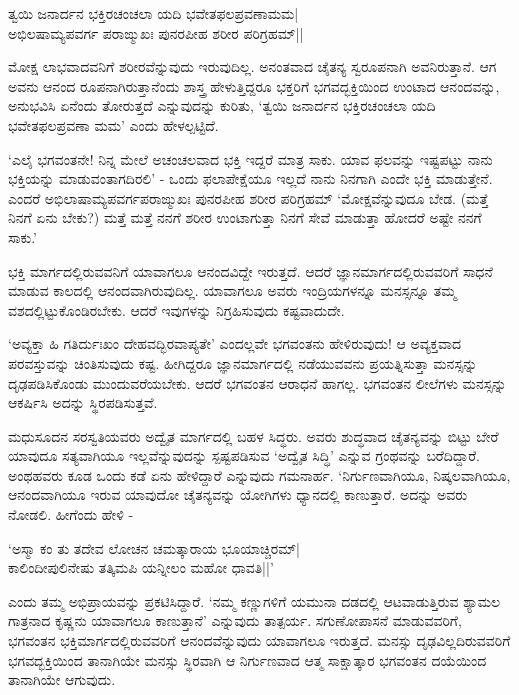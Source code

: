 \begin{shloka}
ತ್ವಯಿ ಜನಾರ್ದನ ಭಕ್ತಿರಚಂಚಲಾ ಯದಿ ಭವೇತಫಲಪ್ರವಣಾಮಮ|\\
ಅಭಿಲಷಾಮ್ಯಪವರ್ಗ ಪರಾಙ್ಮುಖಃ ಪುನರಪೀಹ ಶರೀರ ಪರಿಗ್ರಹಮ್||
\end{shloka}

ಮೋಕ್ಷ ಲಾಭವಾದವನಿಗೆ 
ಶರೀರವೆನ್ನುವುದು 
ಇರುವುದಿಲ್ಲ. ಅನಂತವಾದ 
ಚೈತನ್ಯ ಸ್ವರೂಪನಾಗಿ 
ಅವನಿರುತ್ತಾನೆ. ಆಗ ಅವನು ಆನಂದ 
ರೂಪನಾಗಿರುತ್ತಾನೆಂದು 
ಶಾಸ್ತ್ರ ಹೇಳುತ್ತಿದ್ದರೂ 
ಭಕ್ತರಿಗೆ ಭಗವದ್ಭಕ್ತಿಯಿಂದ 
ಉಂಟಾದ ಆನಂದವನ್ನು, ಅನುಭವಿಸಿ 
ಏನೆಂದು ತೋರುತ್ತದೆ 
ಎನ್ನುವುದನ್ನು ಕುರಿತು, 
`ತ್ವಯಿ ಜನಾರ್ದನ ಭಕ್ತಿರಚಂಚಲಾ ಯದಿ ಭವೇತಫಲಪ್ರವಣಾ ಮಮ' ಎಂದು ಹೇಳಲ್ಪಟ್ಟಿದೆ.

`ಎಲೈ ಭಗವಂತನೇ! ನಿನ್ನ ಮೇಲೆ 
ಅಚಂಚಲವಾದ ಭಕ್ತಿ ಇದ್ದರೆ 
ಮಾತ್ರ ಸಾಕು. ಯಾವ ಫಲವನ್ನು 
ಇಷ್ಟಪಟ್ಟು ನಾನು ಭಕ್ತಿಯನ್ನು 
ಮಾಡುವಂತಾಗದಿರಲಿ' - ಒಂದು 
ಫಲಾಪೇಕ್ಷೆಯೂ ಇಲ್ಲದೆ ನಾನು 
ನಿನಗಾಗಿ ಎಂದೇ ಭಕ್ತಿ 
ಮಾಡುತ್ತೇನೆ. ಎಂದರೆ 
ಅಭಿಲಾಷಾಮ್ಯಪವರ್ಗಪರಾಙ್ಮುಖಃ ಪುನರಪೀಹ ಶರೀರ ಪರಿಗ್ರಹಮ್ `ಮೋಕ್ಷವೆನ್ನುವುದೂ ಬೇಡ. (ಮತ್ತೆ ನಿನಗೆ ಏನು ಬೇಕು?) ಮತ್ತೆ ಮತ್ತೆ ನನಗೆ ಶರೀರ ಉಂಟಾಗುತ್ತಾ ನಿನಗೆ ಸೇವೆ ಮಾಡುತ್ತಾ ಹೋದರೆ ಅಷ್ಟೇ ನನಗೆ ಸಾಕು.'

ಭಕ್ತಿ ಮಾರ್ಗದಲ್ಲಿರುವವನಿಗೆ 
ಯಾವಾಗಲೂ ಆನಂದವಿದ್ದೇ 
ಇರುತ್ತದೆ. ಆದರೆ 
ಜ್ಞಾನಮಾರ್ಗದಲ್ಲಿರುವವರಿಗೆ 
ಸಾಧನೆ ಮಾಡುವ ಕಾಲದಲ್ಲಿ 
ಆನಂದವಾಗಿರುವುದಿಲ್ಲ. 
ಯಾವಾಗಲೂ ಅವರು 
ಇಂದ್ರಿಯಗಳನ್ನೂ ಮನಸ್ಸನ್ನೂ 
ತಮ್ಮ ವಶದಲ್ಲಿಟ್ಟುಕೊಂಡಿರಬೇಕು. ಆದರೆ ಇವುಗಳನ್ನು ನಿಗ್ರಹಿಸುವುದು ಕಷ್ಟವಾದುದೇ.

`ಅವ್ಯಕ್ತಾ ಹಿ ಗತಿರ್ದುಃಖಂ 
ದೇಹವದ್ಭಿರವಾಪ್ಯತೇ' 
ಎಂದಲ್ಲವೇ ಭಗವಂತನು 
ಹೇಳಿರುವುದು! ಆ ಅವ್ಯಕ್ತವಾದ 
ಪರವಸ್ತುವನ್ನು ಚಿಂತಿಸುವುದು 
ಕಷ್ಟ. ಹೀಗಿದ್ದರೂ 
ಜ್ಞಾನಮಾರ್ಗದಲ್ಲಿ 
ನಡೆಯುವವನು ಪ್ರಯತ್ನಿಸುತ್ತಾ 
ಮನಸ್ಸನ್ನು ದೃಢಪಡಿಸಿಕೊಂಡು 
ಮುಂದುವರೆಯಬೇಕು. ಆದರೆ 
ಭಗವಂತನ ಆರಾಧನೆ ಹಾಗಲ್ಲ. 
ಭಗವಂತನ ಲೀಲೆಗಳು ಮನಸ್ಸನ್ನು ಆಕರ್ಷಿಸಿ ಅದನ್ನು ಸ್ಥಿರಪಡಿಸುತ್ತವೆ.

ಮಧುಸೂದನ ಸರಸ್ವತಿಯವರು 
ಅದ್ವೈತ ಮಾರ್ಗದಲ್ಲಿ ಬಹಳ 
ಸಿದ್ಧರು. ಅವರು ಶುದ್ಧವಾದ 
ಚೈತನ್ಯವನ್ನು ಬಿಟ್ಟು ಬೇರೆ 
ಯಾವುದೂ ಸತ್ಯವಾಗಿಯೂ 
ಇಲ್ಲವೆನ್ನುವುದನ್ನು 
ಸ್ಪಷ್ಟಪಡಿಸುವ `ಅದ್ವೈತ 
ಸಿದ್ಧಿ' ಎನ್ನುವ ಗ್ರಂಥವನ್ನು 
ಬರೆದಿದ್ದಾರೆ. ಅಂಥಹವರು ಕೂಡ 
ಒಂದು ಕಡೆ ಏನು ಹೇಳಿದ್ದಾರೆ 
ಎನ್ನುವುದು ಗಮನಾರ್ಹ. 
`ನಿರ್ಗುಣವಾಗಿಯೂ, 
ನಿಷ್ಕಲವಾಗಿಯೂ, ಆನಂದವಾಗಿಯೂ 
ಇರುವ ಯಾವುದೋ ಚೈತನ್ಯವನ್ನು 
ಯೋಗಿಗಳು ಧ್ಯಾನದಲ್ಲಿ ಕಾಣುತ್ತಾರೆ. ಅದನ್ನು ಅವರು ನೋಡಲಿ. ಹೀಗೆಂದು ಹೇಳಿ -

\begin{shloka}
`ಅಸ್ಮಾ ಕಂ ತು ತದೇವ ಲೋಚನ ಚಮತ್ಕಾರಾಯ ಭೂಯಾಚ್ಚಿರಮ್|\\
ಕಾಲಿಂದೀಪುಲಿನೇಷು ತತ್ಕಿಮಪಿ ಯನ್ನೀಲಂ ಮಹೋ ಧಾವತಿ||'
\end{shloka}

ಎಂದು ತಮ್ಮ ಅಭಿಪ್ರಾಯವನ್ನು 
ಪ್ರಕಟಿಸಿದ್ದಾರೆ. `ನಮ್ಮ 
ಕಣ್ಣುಗಳಿಗೆ ಯಮುನಾ ದಡದಲ್ಲಿ 
ಆಟವಾಡುತ್ತಿರುವ ಶ್ಯಾಮಲ 
ಗಾತ್ರನಾದ ಕೃಷ್ಣನು ಯಾವಾಗಲೂ 
ಕಾಣುತ್ತಾನೆ' ಎನ್ನುವುದು 
ತಾತ್ಪರ್ಯ. ಸಗುಣೋಪಾಸನೆ 
ಮಾಡುವವರಿಗೆ, ಭಗವಂತನ 
ಭಕ್ತಿಮಾರ್ಗದಲ್ಲಿರುವವರಿಗೆ 
ಆನಂದವೆನ್ನುವುದು ಯಾವಾಗಲೂ 
ಇರುತ್ತದೆ. ಮನಸ್ಸು 
ದೃಢವಿಲ್ಲದಿರುವವರಿಗೆ 
ಭಗವದ್ಭಕ್ತಿಯಿಂದ ತಾನಾಗಿಯೇ 
ಮನಸ್ಸು ಸ್ಥಿರವಾಗಿ ಆ 
ನಿರ್ಗುಣವಾದ ಆತ್ಮ ಸಾಕ್ಷಾತ್ಕಾರ ಭಗವಂತನ ದಯೆಯಿಂದ ತಾನಾಗಿಯೇ ಆಗುವುದು.

